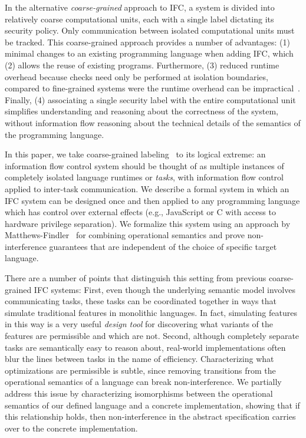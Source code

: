 In the alternative \textit{coarse-grained} approach to IFC,
a system is divided into relatively coarse computational units,
each with a single label dictating its security policy.
Only
communication between isolated computational units must be tracked.
This coarse-grained approach provides a number of advantages:
(1) minimal changes to an
existing programming language when adding IFC, which (2) allows
the reuse of existing programs.  Furthermore, (3)
reduced runtime overhead because checks need only
be performed at isolation boundaries, compared to fine-grained
systems were the runtime overhead can be impractical~\cite{JSFlow}.
Finally, (4) associating
a single security label with the entire computational unit simplifies
understanding and reasoning about the correctness of the
system, without information flow reasoning about the
technical details of the semantics of the programming language.

In this paper, we take coarse-grained labeling~\cite{Zeldovich:2006,
lio} to its logical extreme: an information flow control system should
be thought of as multiple instances of completely isolated language
runtimes or \emph{tasks}, with information flow control applied to
inter-task communication.  We describe a formal system in which an IFC
system can be designed once and then applied to any programming language
which has control over external effects (e.g., JavaScript or C with
access to hardware privilege separation).  We formalize this system
using an approach by
Matthews-Findler~\cite{Matthews:2007:OSM:1190216.1190220} for combining
operational semantics and prove non-interference guarantees
that are independent of the choice of specific target language.

There are a number of points that distinguish this setting from
previous coarse-grained IFC systems:
%
First, even though the underlying semantic model involves communicating
tasks, these tasks can be coordinated together in ways that simulate
traditional features in monolithic languages.  In fact, simulating
features in this way is a very useful \emph{design tool} for discovering
what variants of the features are permissible and which are not.
%
Second, although completely separate tasks are semantically easy to
reason about, real-world implementations often blur the lines between
tasks in the name of efficiency.
Characterizing what optimizations are permissible is subtle, since
removing transitions from the operational semantics of a language can
break non-interference.  We partially address this issue
by characterizing isomorphisms between the operational semantics of our
defined language and a concrete implementation, showing that if this
relationship holds, then non-interference in the abstract specification
carries over to the concrete implementation.

